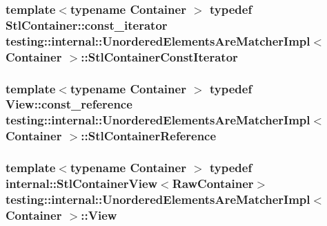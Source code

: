 \subsubsection[{\texorpdfstring{Stl\+Container\+Const\+Iterator}{StlContainerConstIterator}}]{\setlength{\rightskip}{0pt plus 5cm}template$<$typename Container $>$ typedef Stl\+Container\+::const\+\_\+iterator {\bf testing\+::internal\+::\+Unordered\+Elements\+Are\+Matcher\+Impl}$<$ Container $>$\+::{\bf Stl\+Container\+Const\+Iterator}}\hypertarget{classtesting_1_1internal_1_1_unordered_elements_are_matcher_impl_a656c30399e17043db476b639dcd4e6fa}{}\label{classtesting_1_1internal_1_1_unordered_elements_are_matcher_impl_a656c30399e17043db476b639dcd4e6fa}
\subsubsection[{\texorpdfstring{Stl\+Container\+Reference}{StlContainerReference}}]{\setlength{\rightskip}{0pt plus 5cm}template$<$typename Container $>$ typedef {\bf View\+::const\+\_\+reference} {\bf testing\+::internal\+::\+Unordered\+Elements\+Are\+Matcher\+Impl}$<$ Container $>$\+::{\bf Stl\+Container\+Reference}}\hypertarget{classtesting_1_1internal_1_1_unordered_elements_are_matcher_impl_acf64d0e328361d4796bcf1aeb91ed975}{}\label{classtesting_1_1internal_1_1_unordered_elements_are_matcher_impl_acf64d0e328361d4796bcf1aeb91ed975}
\subsubsection[{\texorpdfstring{View}{View}}]{\setlength{\rightskip}{0pt plus 5cm}template$<$typename Container $>$ typedef {\bf internal\+::\+Stl\+Container\+View}$<$Raw\+Container$>$ {\bf testing\+::internal\+::\+Unordered\+Elements\+Are\+Matcher\+Impl}$<$ Container $>$\+::{\bf View}}\hypertarget{classtesting_1_1internal_1_1_unordered_elements_are_matcher_impl_adbd6dfef7713dd30d569b4220eb808d3}{}\label{classtesting_1_1internal_1_1_unordered_elements_are_matcher_impl_adbd6dfef7713dd30d569b4220eb808d3}


